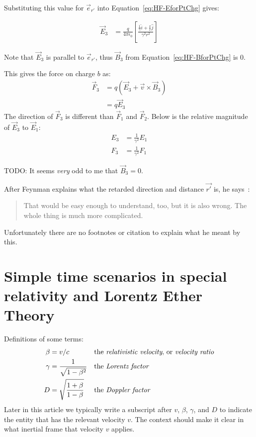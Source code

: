 \documentclass[a4paper]{article}
\theoremstyle{plain}
\theoremstyle{definition}
\newcommand{\vect}[1]{\vec{#1}}
\newcommand{\hatvec}[1]{\hat{#1}}
\newcommand{\ihat}{\hatvec{i}}
\newcommand{\jhat}{\hatvec{j}}
\begin{document}
Substituting this value for $\vect{e}_{r'}$ into
Equation~\eqref{eq:HF-EforPtChg} gives:

\begin{align*}
\vect{E}_3 & = \frac{q}{4 \pi \epsilon_0}
             \left[
               \frac{\frac{1}{\gamma} \ihat + \frac{v}{c} \jhat}{\gamma^2 r^2}
             \right]
\end{align*}

Note that $\vect{E}_3$ is parallel to $\vect{e}_{r'}$, thus
$\vect{B}_3$ from Equation~\eqref{eq:HF-BforPtChg} is 0.

This gives the force on charge $b$ as:
\begin{align*}
\vect{F}_3
  & = q (\vect{E}_3 + \vect{v} \times \vect{B}_3) \\
  & = q \vect{E}_3
\end{align*}
The direction of $\vect{F}_3$ is different than $\vect{F}_1$ and $\vect{F}_2$.
Below is the relative magnitude of $\vect{E}_3$ to $\vect{E}_1$:
\begin{align*}
E_3 & = \frac{1}{\gamma^2} E_1 \\
F_3 & = \frac{1}{\gamma^2} F_1
\end{align*}

TODO: It seems {\em very} odd to me that $\vect{B}_3 = 0$.

After Feynman explains what the retarded direction and distance
$\vect{r'}$ is, he says~\cite{FeynmanLecturesVolICh28}:
\begin{quote}
That would be easy enough to understand, too, but it is also
wrong.  The whole thing is much more complicated.
\end{quote}
Unfortunately there are no footnotes or citation to explain what he
meant by this.


\section{Simple time scenarios in special relativity and Lorentz Ether Theory}
\label{sec:simple-sr-time}

Definitions of some terms:
\begin{align}
  \beta & = v / c \label{defn:betaB} & & \text{the {\em relativistic velocity}, or {\em velocity ratio}} \\
  \gamma & = \frac{1}{\sqrt{1 - \beta^2}} & & \text{the {\em Lorentz factor}} \label{defn:LorentzFactor} \\
  D & = \sqrt{ \frac{1 + \beta}{1 - \beta} } & & \text{the {\em Doppler factor}} \label{defn:DopplerFactor}
\end{align}
Later in this article we typically write a subscript after $v$,
$\beta$, $\gamma$, and $D$ to indicate the entity that has the
relevant velocity $v$.  The context should make it clear in what
inertial frame that velocity $v$ applies.
\end{document}
